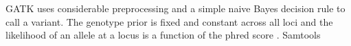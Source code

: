 \documentclass[11pt,reqno]{amsart}
\begin{document}
GATK uses considerable preprocessing and a simple naive Bayes decision rule to call a variant. The genotype prior is fixed and constant across all loci and the likelihood of an allele at a locus is a function of the phred score \cite{McKenna2010}. Samtools



%
%
%
%
%
%
%
%
\end{document}
